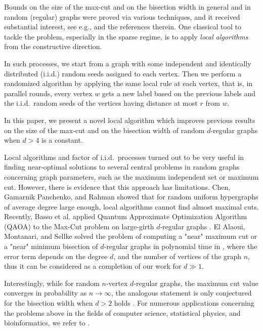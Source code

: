 \documentclass{article}
\theoremstyle{definition}
\begin{document}
 Bounds on the size of the max-cut and on the bisection width  in general and in random (regular) graphs were  proved via various techniques, and it received substantial interest, see e.g., \cite{alon2003maximum, balla2024maxcut, jin2025beyond, raty2023positive} and the references therein. One classical tool to tackle the problem, especially in the sparse regime,  is to apply \textit{local algorithms }from the constructive direction.

In such processes, we start from a graph with some independent and identically distributed (i.i.d.) random seeds assigned to each vertex. Then we perform a randomized algorithm by applying the same local rule at each vertex, that is, in parallel rounds, every vertex $w$ gets a new label based on the previous labels and the i.i.d.\ random seeds of the vertices having distance at most $r$ from $w$.
 
In this paper, we present a novel local algorithm which improves previous results on the size of the max-cut and on the bisection width of random $d$-regular graphs when $d>4$ is a constant.

Local algorithms and factor of i.i.d.\ processes turned out to be very useful in finding near-optimal solutions to several central problems in random graphs concerning graph parameters, such as the maximum independent set or maximum cut. However, there is evidence that this approach has limitations.  Chen, Gamarnik Panchenko, and Rahman \cite{chen2019suboptimality} showed that for random uniform hypergraphs of average degree large enough, local algorithms cannot find almost maximal cuts.
Recently, Basso et al. applied Quantum Approximate Optimization Algorithm (QAOA) to the Max-Cut problem on large-girth $d$-regular graphs \cite{basso2022quantum}.
El Alaoui, Montanari, and Sellke solved the problem of computing a "near" maximum cut or a "near" minimum bisection of $d$-regular graphs in polynomial time in \cite{el2023local}, where the error term depends on the degree $d$, and the number of vertices of the graph $n$, thus it can be considered as a completion of our work for $d\gg 1$.

Interestingly, while for random $n$-vertex $d$-regular graphs, the maximum cut value converges in probability as $n \to \infty$, the analogous statement is only conjectured for the bisection width when $d>2$ holds \cite{bayati2010combinatorial}. 
For numerous applications concerning the problems above in the fields of computer science, statistical physics, and bioinformatics, we refer to \cite{ coja2022ising, klamt2004minimal, poljak1995maximum, sharan2003click}. 
\end{document}
